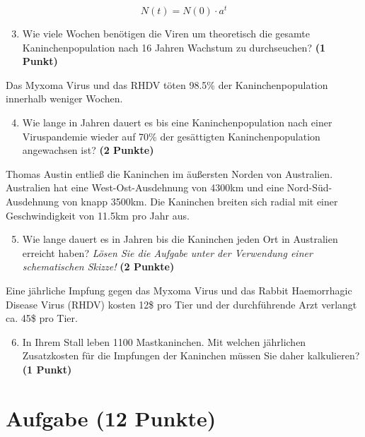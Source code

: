 \documentclass[a4paper, 9pt]{scrartcl}\usepackage[]{graphicx}\usepackage[]{xcolor}
\begin{document}
\begin{equation*}
  N(t) = N(0) \cdot a^t
\end{equation*}

\begin{enumerate}
  \setcounter{enumi}{2}
\item Wie viele Wochen benötigen die Viren um theoretisch die gesamte Kaninchenpopulation nach 16 Jahren Wachstum zu durchseuchen? \textbf{(1 Punkt)}
\end{enumerate}

Das Myxoma Virus und das RHDV töten 98.5\% der Kaninchenpopulation innerhalb weniger Wochen.

\begin{enumerate}
  \setcounter{enumi}{3}  
\item Wie lange in Jahren dauert es bis eine Kaninchenpopulation nach einer Viruspandemie wieder auf 70\% der gesättigten Kaninchenpopulation angewachsen ist?  \textbf{(2 Punkte)}
\end{enumerate}

Thomas Austin entließ die Kaninchen im äußersten Norden von Australien. Australien hat eine West-Ost-Ausdehnung von 4300km und eine Nord-Süd-Ausdehnung von knapp 3500km. Die Kaninchen breiten sich radial mit einer Geschwindigkeit von 11.5km pro Jahr aus.

\begin{enumerate}
  \setcounter{enumi}{4}
\item Wie lange dauert es in Jahren bis die Kaninchen jeden Ort in Australien erreicht haben? \textit{Lösen Sie die Aufgabe unter der Verwendung einer schematischen Skizze!} \textbf{(2 Punkte)}
\end{enumerate}

Eine jährliche Impfung gegen das Myxoma Virus und das Rabbit Haemorrhagic Disease Virus (RHDV) kosten 12\$ pro Tier und der durchführende Arzt verlangt ca. 45\$ pro Tier.

\begin{enumerate}
  \setcounter{enumi}{5}
\item In Ihrem Stall leben 1100 Mastkaninchen. Mit welchen jährlichen Zusatzkosten für die Impfungen der Kaninchen müssen Sie daher kalkulieren? \textbf{(1 Punkt)}
\end{enumerate}
 
\clearpage

\section{Aufgabe \hfill (12 Punkte)}
\end{document}

